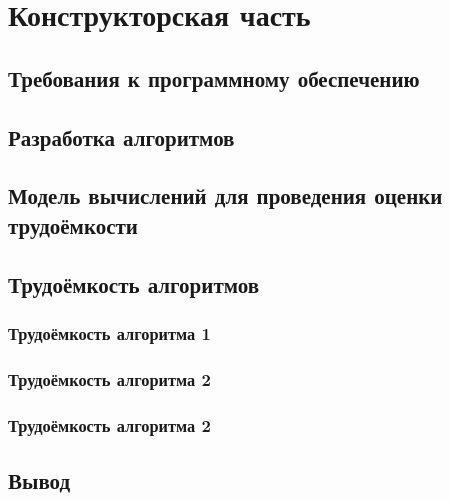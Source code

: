 \section{Конструкторская часть}


\subsection{Требования к программному обеспечению}


\subsection{Разработка алгоритмов}


\subsection{Модель вычислений для проведения оценки трудоёмкости}


\subsection{Трудоёмкость алгоритмов}


\subsubsection{Трудоёмкость алгоритма 1}

\subsubsection{Трудоёмкость алгоритма 2}

\subsubsection{Трудоёмкость алгоритма 2}

\subsection*{Вывод}

